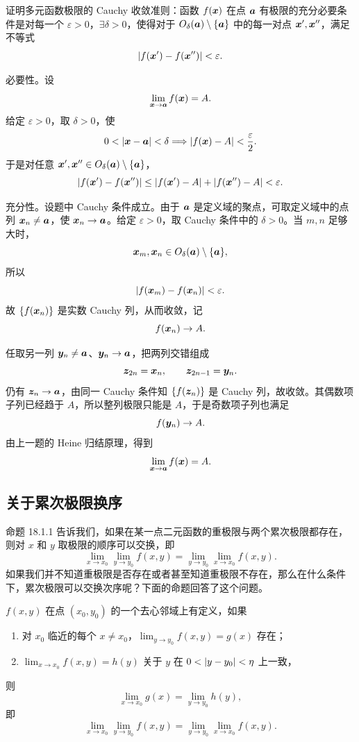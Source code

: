 \begin{xthought}[2]
证明多元函数极限的 Cauchy 收敛准则：函数 $f(\bm{x})$ 在点 $\bm{a}$ 有极限的充分必要条件是对每一个 $\varepsilon>0$，$\exists\delta>0$，使得对于 $O_\delta(\bm{a})\setminus\{\bm{a}\}$ 中的每一对点 $\bm{x}',\bm{x}''$，满足不等式
  \[
    \lvert f(\bm{x}')-f(\bm{x}'')\rvert<\varepsilon.
  \]
\end{xthought}
\begin{xsolution}
必要性。设
\[
  \lim_{\bm{x}\to\bm{a}}f(\bm{x})=A.
\]
给定 $\varepsilon>0$，取 $\delta>0$，使
\[
  0<\lvert\bm{x}-\bm{a}\rvert<\delta
  \Longrightarrow
  \lvert f(\bm{x})-A\rvert<\frac\varepsilon2.
\]
于是对任意 $\bm{x}',\bm{x}''\in O_\delta(\bm{a})\setminus\{\bm{a}\}$，
\[
  \lvert f(\bm{x}')-f(\bm{x}'')\rvert
  \le
  \lvert f(\bm{x}')-A\rvert+\lvert f(\bm{x}'')-A\rvert
  <\varepsilon.
\]

充分性。设题中 Cauchy 条件成立。由于 $\bm{a}$ 是定义域的聚点，可取定义域中的点列 $\bm{x}_n\ne\bm{a}$，使 $\bm{x}_n\to\bm{a}$。给定 $\varepsilon>0$，取 Cauchy 条件中的 $\delta>0$。当 $m,n$ 足够大时，
\[
  \bm{x}_m,\bm{x}_n\in O_\delta(\bm{a})\setminus\{\bm{a}\},
\]
所以
\[
  \lvert f(\bm{x}_m)-f(\bm{x}_n)\rvert<\varepsilon.
\]
故 $\{f(\bm{x}_n)\}$ 是实数 Cauchy 列，从而收敛，记
\[
  f(\bm{x}_n)\to A.
\]

任取另一列 $\bm{y}_n\ne\bm{a}$、$\bm{y}_n\to\bm{a}$，把两列交错组成
\[
  \bm{z}_{2n}=\bm{x}_n,
  \qquad
  \bm{z}_{2n-1}=\bm{y}_n.
\]
仍有 $\bm{z}_n\to\bm{a}$，由同一 Cauchy 条件知 $\{f(\bm{z}_n)\}$ 是 Cauchy 列，故收敛。其偶数项子列已经趋于 $A$，所以整列极限只能是 $A$，于是奇数项子列也满足
\[
  f(\bm{y}_n)\to A.
\]
由上一题的 Heine 归结原理，得到
\[
  \lim_{\bm{x}\to\bm{a}}f(\bm{x})=A.
\]
\end{xsolution}


\subsection{关于累次极限换序}

命题 18.1.1 告诉我们，如果在某一点二元函数的重极限与两个累次极限都存在，则对 $x$ 和 $y$ 取极限的顺序可以交换，即
\[
  \lim_{x\to x_0}\lim_{y\to y_0}f(x,y)
  =\lim_{y\to y_0}\lim_{x\to x_0}f(x,y).
\]
如果我们并不知道重极限是否存在或者甚至知道重极限不存在，那么在什么条件下，累次极限可以交换次序呢？下面的命题回答了这个问题。

\begin{xproposition}[18.1.2]
$f(x,y)$ 在点 $(x_0,y_0)$ 的一个去心邻域上有定义，如果
\begin{enumerate}[label=(\arabic*)]
  \item 对 $x_0$ 临近的每个 $x\ne x_0$，$\displaystyle\lim_{y\to y_0}f(x,y)=g(x)$ 存在；
  \item $\displaystyle\lim_{x\to x_0}f(x,y)=h(y)$ 关于 $y$ 在 $0<\lvert y-y_0\rvert<\eta$ 上一致，
\end{enumerate}
则
\[
  \lim_{x\to x_0}g(x)=\lim_{y\to y_0}h(y),
\]
即
\[
  \lim_{x\to x_0}\lim_{y\to y_0}f(x,y)
  =\lim_{y\to y_0}\lim_{x\to x_0}f(x,y).
\]
\end{xproposition}


